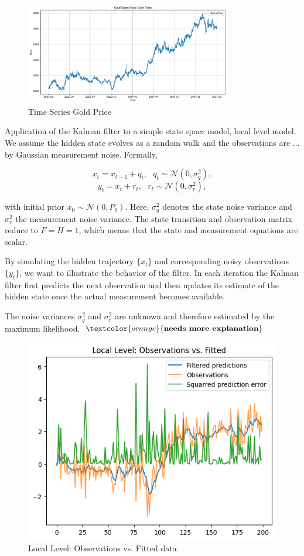 \begin{figure}
    \centering
    \includegraphics[width=0.8\textwidth]{Figures/Time Series Gold Price.png}
    \caption{Time Series Gold Price}
    \label{fig:time_series_goldprice}
\end{figure}





\newpage

Application of the Kalman filter to a simple state space model, local level model. We assume the hidden state evolves as a random walk and the observations are ... by Gaussian measurement noise. Formally, 

$$x_t = x_{t-1}+q_t, \textbf{ }q_t \sim\mathcal{N}(0, \sigma^2_q),$$
$$y_t = x_t+r_t, \textbf{ } r_t \sim \mathcal{N}(0, \sigma^2_r),$$

with initial prior $x_0 \sim \mathcal{N}(0, P_0)$. Here, $\sigma^2_q$ denotes the state noise variance and $\sigma^2_r$ the measurement noise variance. The state transition and observation matrix reduce to $F=H=1$, which means that the state and measurement equations are scalar. 

By simulating the hidden trajectory $\{x_t\}$ and corresponding noisy observations $\{y_t\}$, we want to illustrate the behavior of the filter. In each iteration the Kalman filter first predicts the next observation and then updates its estimate of the hidden state once the actual measurement becomes available. 

The noise variances $\sigma^2_q$ and $\sigma^2_r$ are unknown and therefore estimated by the maximum likelihood. $\textcolor{orange}{\textbf{needs more explanation}}$



\begin{figure}
    \centering
\includegraphics[width=0.5\linewidth]{Figures/Local Level.png}
    \caption{Local Level: Observations vs. Fitted data}
    \label{fig:placeholder}
\end{figure}

